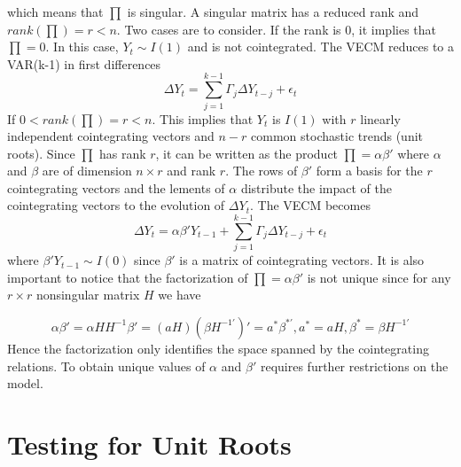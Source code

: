 \documentclass[11pt,a4,twosided,singlespacing,titlepagenumber=on]{scrreprt}
\numberwithin{equation}{chapter} %
\theoremstyle{remark}
\begin{document}
which means that $\prod$ is singular. A singular matrix has a reduced rank and $rank(\prod) = r < n$. Two cases are to consider. If the rank is 0, it implies that $\prod = 0$. In this case, $Y_t \sim I(1)$ and is not cointegrated. The VECM reduces to a VAR(k-1) in first differences
$$\Delta Y_t = \sum_{j=1}^{k-1} \Gamma_j \Delta Y_{t-j} + \epsilon_t $$
If $0 < rank(\prod) = r < n$. This implies that $Y_t$ is $I(1)$ with $r$ linearly independent cointegrating vectors and $n-r$ common stochastic trends (unit roots). Since $\prod$ has rank $r$, it can be written as the product $\prod = \alpha \beta'$ where $\alpha$ and $\beta$ are of dimension $n \times r$ and rank $r$.  The rows of $\beta'$ form a basis for the $r$ cointegrating vectors and the lements of $\alpha$ distribute the impact of the cointegrating vectors to the evolution of $\Delta Y_t$. The VECM becomes
$$\Delta Y_t = \alpha \beta' Y_{t-1} + \sum_{j=1}^{k-1} \Gamma_j \Delta Y_{t-j} + \epsilon_t $$
where $\beta' Y_{t-1} \sim I(0)$ since $\beta'$ is a matrix of cointegrating vectors. It is also important to notice that the factorization of $\prod = \alpha \beta'$ is not unique since for any $r \times r$ nonsingular matrix $H$ we have

$$\alpha \beta' = \alpha H H^{-1} \beta' = (aH)(\beta H^{-1'})' = a^* \beta^{*'}, a^* = aH, \beta^* = \beta H^{-1'}$$
Hence the factorization only identifies the space spanned by the cointegrating relations. To obtain unique values of $\alpha$ and $\beta'$ requires further restrictions on the model.

\section{Testing for Unit Roots}
\end{document}
